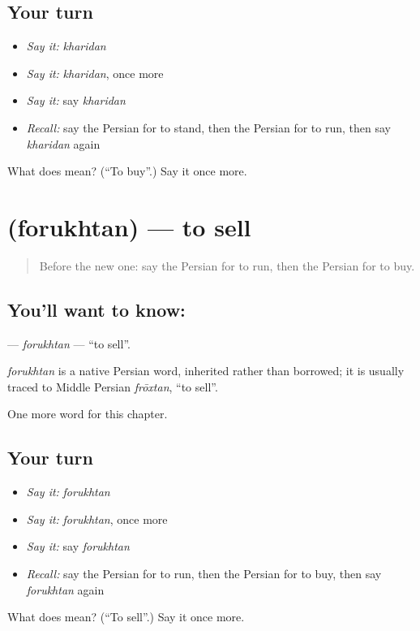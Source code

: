 \subsection*{Your turn}
\begin{itemize}
\raggedright
  \item \emph{Say it:} \emph{kharidan}
  \item \emph{Say it:} \emph{kharidan}, once more
  \item \emph{Say it:} say \emph{kharidan}
  \item \emph{Recall:} say the Persian for to stand, then the Persian for to run, then say \emph{kharidan} again
\end{itemize}

\begin{tcolorbox}[breakable,colback=teal!4,colframe=teal!35!black,title={Before you move on}]
What does  mean? (\textquotedblleft{}To buy\textquotedblright{}.) Say it once more.
\end{tcolorbox}
\section[\texorpdfstring{\fa{فروختن} (forukhtan)}{فروختن (forukhtan)}]{ (forukhtan) — to sell}

\label{lesson:FA-C36-forukhtan}



\begin{quote}
Before the new one: say the Persian for to run, then the Persian for to buy.
\end{quote}

\subsection*{You'll want to know: }
\textbf{} — \emph{forukhtan} — \textquotedblleft{}to sell\textquotedblright{}.

\begin{cousinweb}
\emph{forukhtan} is a native Persian word, inherited rather than borrowed; it is usually traced to Middle Persian \emph{frōxtan}, \textquotedblleft{}to sell\textquotedblright{}.
\end{cousinweb}

\begin{grammarlens}[title={What you've built}]
One more word for this chapter.
\end{grammarlens}

\subsection*{Your turn}
\begin{itemize}
\raggedright
  \item \emph{Say it:} \emph{forukhtan}
  \item \emph{Say it:} \emph{forukhtan}, once more
  \item \emph{Say it:} say \emph{forukhtan}
  \item \emph{Recall:} say the Persian for to run, then the Persian for to buy, then say \emph{forukhtan} again
\end{itemize}

\begin{tcolorbox}[breakable,colback=teal!4,colframe=teal!35!black,title={Before you move on}]
What does  mean? (\textquotedblleft{}To sell\textquotedblright{}.) Say it once more.
\end{tcolorbox}
